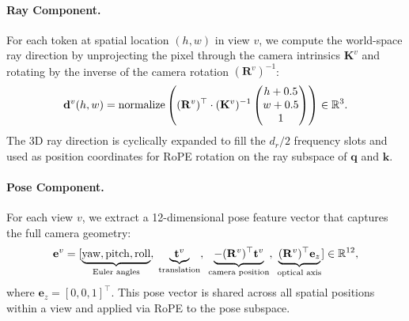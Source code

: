 \paragraph{Ray Component.}
For each token at spatial location $(h, w)$ in view $v$, we compute the world-space ray direction by unprojecting the pixel through the camera intrinsics $\mathbf{K}^v$ and rotating by the inverse of the camera rotation $(\mathbf{R}^v)^{-1}$:
\begin{equation}
\label{eq:ray-dir}
\mathbf{d}^v(h,w) = \text{normalize}\left((\mathbf{R}^v)^\top \cdot (\mathbf{K}^v)^{-1} \begin{pmatrix} h + 0.5 \\ w + 0.5 \\ 1 \end{pmatrix}\right) \in \mathbb{R}^3.
\end{equation}
The 3D ray direction is cyclically expanded to fill the $d_r/2$ frequency slots and used as position coordinates for RoPE rotation on the ray subspace of $\mathbf{q}$ and $\mathbf{k}$.

\paragraph{Pose Component.}
For each view $v$, we extract a 12-dimensional pose feature vector that captures the full camera geometry:
\begin{equation}
\label{eq:pose-feat}
\mathbf{e}^v = [\underbrace{\text{yaw}, \text{pitch}, \text{roll}}_{\text{Euler angles}},\; \underbrace{\mathbf{t}^v}_{\text{translation}},\; \underbrace{-(\mathbf{R}^v)^\top \mathbf{t}^v}_{\text{camera position}},\; \underbrace{(\mathbf{R}^v)^\top \mathbf{e}_z}_{\text{optical axis}}] \in \mathbb{R}^{12},
\end{equation}
where $\mathbf{e}_z = [0,0,1]^\top$. This pose vector is shared across all spatial positions within a view and applied via RoPE to the pose subspace.

